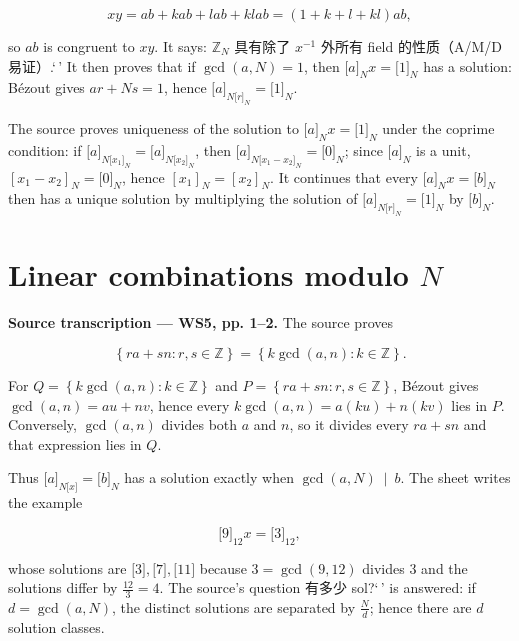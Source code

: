 \[xy = ab + kab + lab + klab = \left( {1 + k + l + kl} \right)ab,\]

so \(ab\) is congruent to \(xy\). It says: \(\mathbb{Z}_{N}\) 具有除了 \(x^{- 1}\) 外所有 field 的性质（A/M/D 易证）.`\,' It then proves that if \(\gcd\left( {a,N} \right) = 1\), then \(\lbrack a\rbrack_{N}x = \lbrack 1\rbrack_{N}\) has a solution: Bézout gives \(ar + Ns = 1\), hence \(\lbrack a\rbrack_{{N{\lbrack r\rbrack}}_{N}} = \lbrack 1\rbrack_{N}\).

The source proves uniqueness of the solution to \(\lbrack a\rbrack_{N}x = \lbrack 1\rbrack_{N}\) under the coprime condition: if \(\lbrack a\rbrack_{{N{\lbrack x_{1}\rbrack}}_{N}} = \lbrack a\rbrack_{{N{\lbrack x_{2}\rbrack}}_{N}}\), then \(\lbrack a\rbrack_{{N{\lbrack{x_{1} - x_{2}}\rbrack}}_{N}} = \lbrack 0\rbrack_{N}\); since \(\lbrack a\rbrack_{N}\) is a unit, \(\left\lbrack {x_{1} - x_{2}} \right\rbrack_{N} = \lbrack 0\rbrack_{N}\), hence \(\left\lbrack x_{1} \right\rbrack_{N} = \left\lbrack x_{2} \right\rbrack_{N}\). It continues that every \(\lbrack a\rbrack_{N}x = \lbrack b\rbrack_{N}\) then has a unique solution by multiplying the solution of \(\lbrack a\rbrack_{{N{\lbrack r\rbrack}}_{N}} = \lbrack 1\rbrack_{N}\) by \(\lbrack b\rbrack_{N}\).

\section{\texorpdfstring{Linear combinations modulo \(N\)}{Linear combinations modulo N}}

\textbf{Source transcription --- WS5, pp. 1--2.} The source proves

\[\left\{ {ra + sn:r,s \in \mathbb{Z}} \right\} = \left\{ {k\gcd\left( {a,n} \right):k \in \mathbb{Z}} \right\}.\]

For \(Q = \left\{ {k\gcd\left( {a,n} \right):k \in \mathbb{Z}} \right\}\) and \(P = \left\{ {ra + sn:r,s \in \mathbb{Z}} \right\}\), Bézout gives \(\gcd\left( {a,n} \right) = au + nv\), hence every \(k\gcd\left( {a,n} \right) = a\left( {ku} \right) + n\left( {kv} \right)\) lies in \(P\). Conversely, \(\gcd\left( {a,n} \right)\) divides both \(a\) and \(n\), so it divides every \(ra + sn\) and that expression lies in \(Q\).

Thus \(\lbrack a\rbrack_{N{\lbrack x\rbrack}} = \lbrack b\rbrack_{N}\) has a solution exactly when \(\left. \gcd\left( {a,N} \right)\  \middle| \ b \right.\). The sheet writes the example

\[\lbrack 9\rbrack_{12}x = \lbrack 3\rbrack_{12},\]

whose solutions are \(\lbrack 3\rbrack,\lbrack 7\rbrack,\lbrack 11\rbrack\) because \(3 = \gcd\left( {9,12} \right)\) divides \(3\) and the solutions differ by \(\frac{12}{3} = 4\). The source's question 有多少 sol?{\kern0pt}`\,' is answered: if \(d = \gcd\left( {a,N} \right)\), the distinct solutions are separated by \(\frac{N}{d}\); hence there are \(d\) solution classes.
